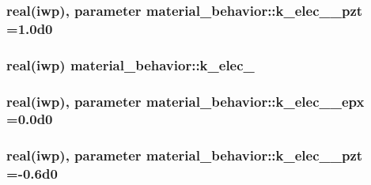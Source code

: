 \subsubsection[{k\+\_\+elec\+\_\+00\+\_\+pzt}]{\setlength{\rightskip}{0pt plus 5cm}real(iwp), parameter material\+\_\+behavior\+::k\+\_\+elec\+\_\+\_\+pzt =1.\+0d0}\label{classmaterial__behavior_a94bfa8bcfa3df70aabe1615a9974c5a1}
\hypertarget{classmaterial__behavior_a0ea3e3331e781d97068a80fe41788aaf}{}
\subsubsection[{k\+\_\+elec\+\_\+01}]{\setlength{\rightskip}{0pt plus 5cm}real(iwp) material\+\_\+behavior\+::k\+\_\+elec\+\_}\label{classmaterial__behavior_a0ea3e3331e781d97068a80fe41788aaf}
\hypertarget{classmaterial__behavior_a821416be28a36a49165c9c8a50556c81}{}
\subsubsection[{k\+\_\+elec\+\_\+01\+\_\+epx}]{\setlength{\rightskip}{0pt plus 5cm}real(iwp), parameter material\+\_\+behavior\+::k\+\_\+elec\+\_\+\_\+epx =0.\+0d0}\label{classmaterial__behavior_a821416be28a36a49165c9c8a50556c81}
\hypertarget{classmaterial__behavior_af2d3155f15083287aaa2bf064b90ca3c}{}
\subsubsection[{k\+\_\+elec\+\_\+01\+\_\+pzt}]{\setlength{\rightskip}{0pt plus 5cm}real(iwp), parameter material\+\_\+behavior\+::k\+\_\+elec\+\_\+\_\+pzt =-\/0.\+6d0}\label{classmaterial__behavior_af2d3155f15083287aaa2bf064b90ca3c}
\hypertarget{classmaterial__behavior_ad71dfe377781d970157d3ff0d60053b3}{}
